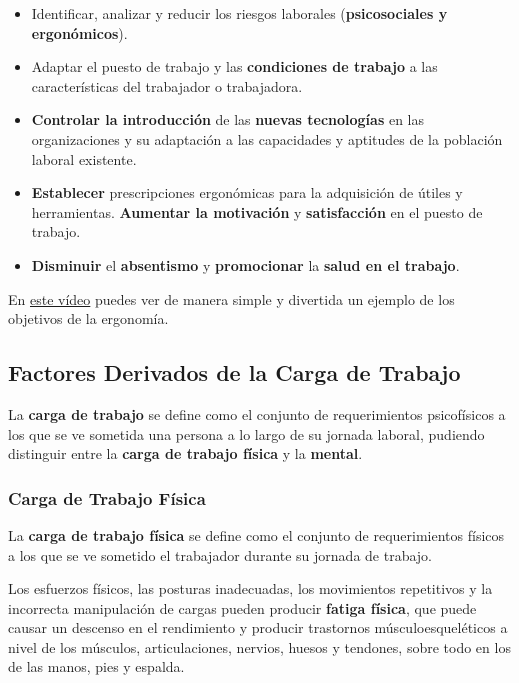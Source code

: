 \begin{itemize}
    \item Identificar, analizar y reducir los riesgos laborales (\textbf{psicosociales y ergonómicos}).
    \item Adaptar el puesto de trabajo y las \textbf{condiciones de trabajo} a las características del trabajador o trabajadora.
    \item \textbf{Controlar la introducción} de las \textbf{nuevas tecnologías} en las organizaciones y su adaptación a las capacidades y aptitudes de la población laboral existente.
    \item \textbf{Establecer} prescripciones ergonómicas para la adquisición de útiles y herramientas.
    \textbf{Aumentar la motivación} y \textbf{satisfacción} en el puesto de trabajo.
    \item \textbf{Disminuir} el \textbf{absentismo} y \textbf{promocionar} la \textbf{salud en el trabajo}.
\end{itemize}

En \href{https://www.youtube.com/watch?v=a5pXLcGkvjY&ab_channel=EduardoLozano}{este vídeo} puedes ver de manera simple y divertida un ejemplo de los objetivos de la ergonomía.

\subsection{Factores Derivados de la Carga de Trabajo}
La \textbf{carga de trabajo} se define como el conjunto de requerimientos psicofísicos a los que se ve sometida una persona a lo largo de su jornada laboral, pudiendo distinguir entre la \textbf{carga de trabajo física} y la \textbf{mental}.

\subsubsection{Carga de Trabajo Física}

La \textbf{carga de trabajo física} se define como el conjunto de requerimientos físicos a los que se ve sometido el trabajador durante su jornada de trabajo.

Los esfuerzos físicos, las posturas inadecuadas, los movimientos repetitivos y la incorrecta manipulación de cargas pueden producir \textbf{fatiga física}, que puede causar un descenso en el rendimiento y producir trastornos músculoesqueléticos a nivel de los músculos, articulaciones, nervios, huesos y tendones, sobre todo en los de las manos, pies y espalda.

